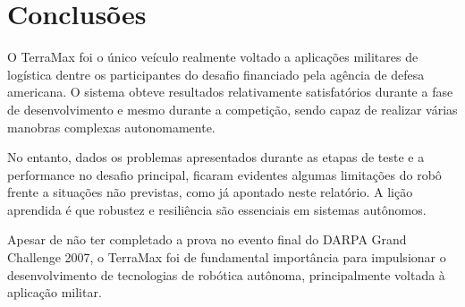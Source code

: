 \section{Conclusões}

O TerraMax foi o único veículo realmente voltado a aplicações militares de logística dentre os participantes do desafio financiado pela agência de defesa americana. O sistema obteve resultados relativamente satisfatórios durante a fase de desenvolvimento e mesmo durante a competição, sendo capaz de realizar várias manobras complexas autonomamente.

No entanto, dados os problemas apresentados durante as etapas de teste e a performance no desafio principal, ficaram evidentes algumas limitações do robô frente a situações não previstas, como já apontado neste relatório. A lição aprendida é que robustez e resiliência são essenciais em sistemas autônomos.

Apesar de não ter completado a prova no evento final do DARPA Grand Challenge 2007, o TerraMax foi de fundamental importância para impulsionar o desenvolvimento de tecnologias de robótica autônoma, principalmente voltada à aplicação militar.
